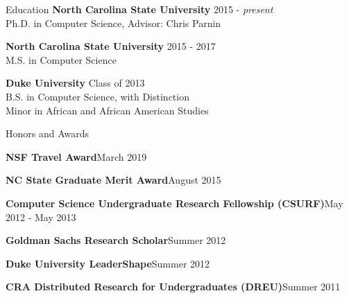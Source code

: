 \documentclass{resume} %
\begin{document}
\vspace{-10pt}
\begin{rSection}{Education}
\vspace{-4pt}
{\bf North Carolina State University} \hfill {2015 - \textit{present}} \\ 
Ph.D. in Computer Science, Advisor: Chris Parnin
\vspace{-4pt}

{\bf North Carolina State University} \hfill {2015 - 2017} \\ 
M.S. in Computer Science
\vspace{-4pt}

{\bf Duke University} \hfill {Class of 2013} \\ 
B.S. in Computer Science, with Distinction \\
Minor in African and African American Studies
\end{rSection}
\vspace{-7pt}
\vspace{-4pt}

\begin{rSection}{Honors and Awards}
\vspace{-4pt}
\begin{sSubsection}
    {\textbf{NSF Travel Award}}{March 2019}
\end{sSubsection}
\vspace{-7pt}
\begin{sSubsection}
    {\textbf{NC State Graduate Merit Award}}{August 2015}
\end{sSubsection}
\vspace{-7pt}
\begin{sSubsection}
    {\textbf{Computer Science Undergraduate Research Fellowship (CSURF)}}{May 2012 - May 2013}
\end{sSubsection}
\vspace{-7pt}
\begin{sSubsection}
    {\textbf{Goldman Sachs Research Scholar}}{Summer 2012}
\end{sSubsection}
\vspace{-7pt}
\begin{sSubsection}
    {\textbf{Duke University LeaderShape}}{Summer 2012}
\end{sSubsection}
\vspace{-7pt}
\begin{sSubsection}
    {\textbf{CRA Distributed Research for Undergraduates (DREU)}}{Summer 2011}
\end{sSubsection}
\vspace{-5pt}
\end{rSection}
\vspace{-7pt}
\end{document}
